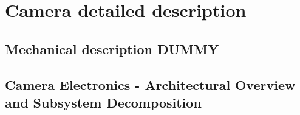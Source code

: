 \documentclass[10pt,a4paper]{report}
\begin{document}

\listoftodos
\tableofcontents

\chapter{Camera detailed description}

\section{Mechanical description DUMMY}



\section{Camera Electronics - Architectural Overview and Subsystem Decomposition}
\end{document}
